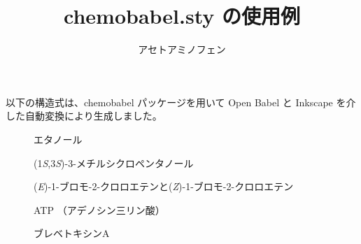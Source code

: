 \documentclass{jsarticle}
\title{\textsf{chemobabel.sty} の使用例}
\author{アセトアミノフェン}
\begin{document}
\maketitle
以下の構造式は、\textsf{chemobabel} パッケージを用いて Open Babel と Inkscape を介した自動変換により生成しました。

\begin{figure}[ht]
  \centering
  \caption{エタノール}
\end{figure}

\begin{figure}[ht]
  \centering
  \caption{(1\textit{S},3\textit{S})-3-メチルシクロペンタノール}
\end{figure}

\begin{figure}[ht]
  \centering
  \caption{(\textit{E})-1-ブロモ-2-クロロエテンと(\textit{Z})-1-ブロモ-2-クロロエテン}
\end{figure}

\begin{figure}[ht]
  \centering
  \caption{ATP （アデノシン三リン酸）}
\end{figure}

\begin{figure}[ht]
  \centering
  \caption{ブレベトキシンA}
\end{figure}
\end{document}
